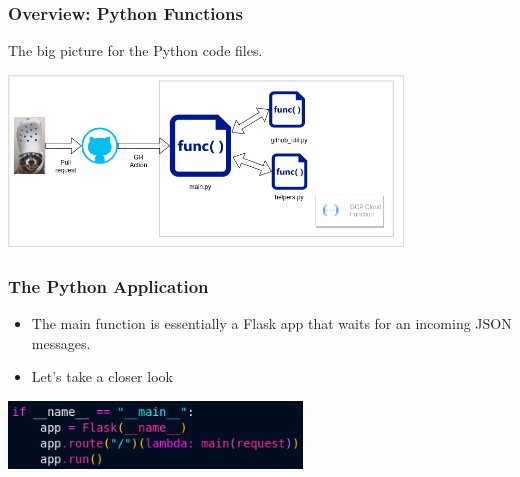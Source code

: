 \documentclass[aspectratio=169]{beamer}
\begin{document}
\begin{frame}
	\frametitle{Overview: Python Functions}
	The big picture for the Python code files.
	\vspace{2mm}

	\includegraphics[width=0.785\textwidth]{../images/arch_diagrams-python-big-block.png}
\end{frame}

\begin{frame}
	\frametitle{The Python Application}

	\begin{itemize}
		\item The main function is essentially a Flask app that waits for an incoming JSON messages.
		\item Let's take a closer look
	\end{itemize}
	\begin{center}
		\includegraphics[width=0.585\textwidth]{../images/main-function-py.png}
	\end{center}

\end{frame}
\end{document}
